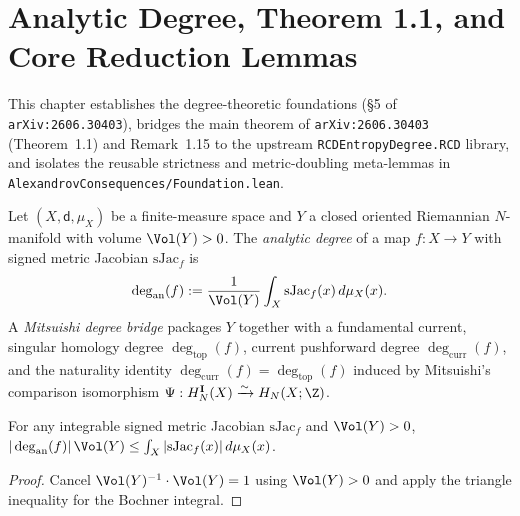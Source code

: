 \chapter{Analytic Degree, Theorem 1.1, and Core Reduction Lemmas}

This chapter establishes the degree-theoretic foundations (\S5 of \texttt{arXiv:2606.30403}),
bridges the main theorem of \texttt{arXiv:2606.30403} (Theorem~1.1) and Remark~1.15 to the
upstream \texttt{RCDEntropyDegree.RCD} library, and isolates the reusable strictness and metric-doubling
meta-lemmas in \texttt{AlexandrovConsequences/Foundation.lean}.

\begin{definition}
\label{def_analytic_degree}
\leanok
Let $(X, \mathsf{d}, \mu_X)$ be a finite-measure space and $Y$ a closed oriented Riemannian
$N$-manifold with volume $\Vol(Y) > 0$. The \emph{analytic degree} of a map $f : X \to Y$ with
signed metric Jacobian $\mathrm{sJac}_f$ is
\[
  \deg_{\mathrm{an}}(f) := \frac{1}{\Vol(Y)} \int_X \mathrm{sJac}_f(x)\,d\mu_X(x).
\]
A \emph{Mitsuishi degree bridge} packages $Y$ together with a fundamental current, singular
homology degree $\deg_{\mathrm{top}}(f)$, current pushforward degree $\deg_{\mathrm{curr}}(f)$,
and the naturality identity $\deg_{\mathrm{curr}}(f) = \deg_{\mathrm{top}}(f)$ induced by
Mitsuishi's comparison isomorphism $\Psi : H_N^{\mathbf{I}}(X) \xrightarrow{\sim} H_N(X;\Z)$.
\end{definition}

\begin{lemma}
\label{lem_analytic_degree_integral_bound}
\leanok
{}
For any integrable signed metric Jacobian $\mathrm{sJac}_f$ and $\Vol(Y) > 0$,
$|\deg_{\mathrm{an}}(f)|\,\Vol(Y) \le \int_X |\mathrm{sJac}_f(x)|\,d\mu_X(x)$.
\end{lemma}
\begin{proof}\leanok
Cancel $\Vol(Y)^{-1} \cdot \Vol(Y) = 1$ using $\Vol(Y) > 0$ and apply the triangle inequality
for the Bochner integral.
\end{proof}

